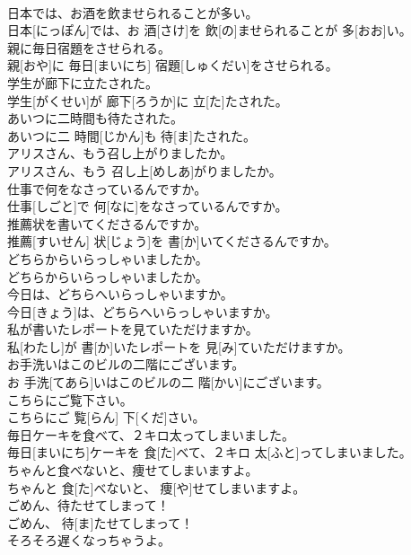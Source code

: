 \documentclass[8pt]{extreport}
\begin{document}
\begin{CJK}{UTF8}{min}
\\	日本では、お酒を飲ませられることが多い。	
\\	日本[にっぽん]では、お 酒[さけ]を 飲[の]ませられることが 多[おお]い。	
\\	親に毎日宿題をさせられる。	
\\	親[おや]に 毎日[まいにち] 宿題[しゅくだい]をさせられる。	
\\	学生が廊下に立たされた。	
\\	学生[がくせい]が 廊下[ろうか]に 立[た]たされた。	
\\	あいつに二時間も待たされた。	
\\	あいつに二 時間[じかん]も 待[ま]たされた。	
\\	アリスさん、もう召し上がりましたか。	
\\	アリスさん、もう 召し上[めしあ]がりましたか。	
\\	仕事で何をなさっているんですか。	
\\	仕事[しごと]で 何[なに]をなさっているんですか。	
\\	推薦状を書いてくださるんですか。	
\\	推薦[すいせん] 状[じょう]を 書[か]いてくださるんですか。	
\\	どちらからいらっしゃいましたか。	
\\	どちらからいらっしゃいましたか。	
\\	今日は、どちらへいらっしゃいますか。	
\\	今日[きょう]は、どちらへいらっしゃいますか。	
\\	私が書いたレポートを見ていただけますか。	
\\	私[わたし]が 書[か]いたレポートを 見[み]ていただけますか。	
\\	お手洗いはこのビルの二階にございます。	
\\	お 手洗[てあら]いはこのビルの二 階[かい]にございます。	
\\	こちらにご覧下さい。	
\\	こちらにご 覧[らん] 下[くだ]さい。	
\\	毎日ケーキを食べて、２キロ太ってしまいました。	
\\	毎日[まいにち]ケーキを 食[た]べて、２キロ 太[ふと]ってしまいました。	
\\	ちゃんと食べないと、痩せてしまいますよ。	
\\	ちゃんと 食[た]べないと、 痩[や]せてしまいますよ。	
\\	ごめん、待たせてしまって！	
\\	ごめん、 待[ま]たせてしまって！	
\\	そろそろ遅くなっちゃうよ。	

\end{CJK}
\end{document}
